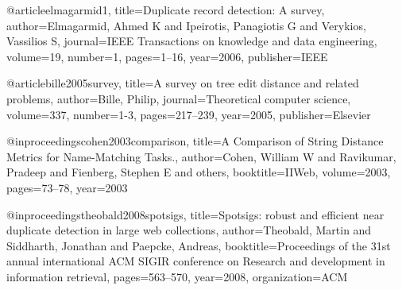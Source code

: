 @article{elmagarmid1,
  title={Duplicate record detection: A survey},
  author={Elmagarmid, Ahmed K and Ipeirotis, Panagiotis G and Verykios, Vassilios S},
  journal={IEEE Transactions on knowledge and data engineering},
  volume={19},
  number={1},
  pages={1--16},
  year={2006},
  publisher={IEEE}
}

@article{bille2005survey,
  title={A survey on tree edit distance and related problems},
  author={Bille, Philip},
  journal={Theoretical computer science},
  volume={337},
  number={1-3},
  pages={217--239},
  year={2005},
  publisher={Elsevier}
}

@inproceedings{cohen2003comparison,
  title={A Comparison of String Distance Metrics for Name-Matching Tasks.},
  author={Cohen, William W and Ravikumar, Pradeep and Fienberg, Stephen E and others},
  booktitle={IIWeb},
  volume={2003},
  pages={73--78},
  year={2003}
}

@inproceedings{theobald2008spotsigs,
  title={Spotsigs: robust and efficient near duplicate detection in large web collections},
  author={Theobald, Martin and Siddharth, Jonathan and Paepcke, Andreas},
  booktitle={Proceedings of the 31st annual international ACM SIGIR conference on Research and development in information retrieval},
  pages={563--570},
  year={2008},
  organization={ACM}
}